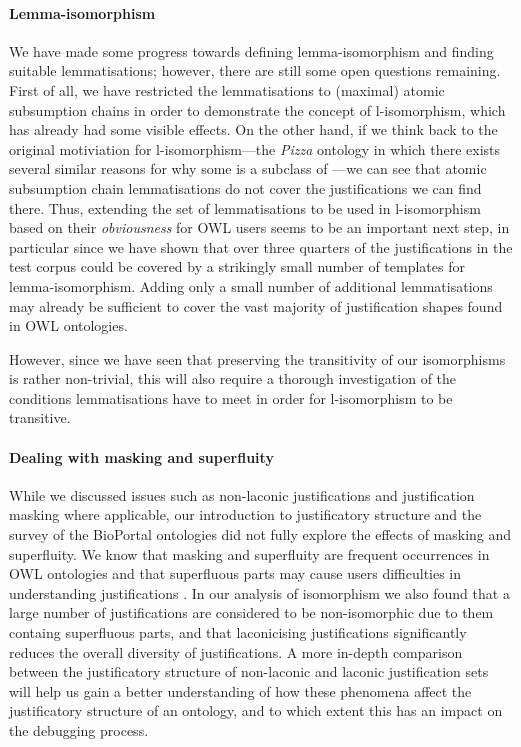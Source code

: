 \paragraph{Lemma-isomorphism}
We have made some progress towards defining lemma-isomorphism and finding suitable lemmatisations; however, there are still some open questions remaining. First of all, we have restricted the lemmatisations to (maximal) atomic subsumption chains in order to demonstrate the concept of l-isomorphism, which has already had some visible effects. On the other hand, if we think back to the original motiviation for l-isomorphism---the \emph{Pizza} ontology in which there exists several similar reasons for why some  is a subclass of ---we can see that atomic subsumption chain lemmatisations do not cover the justifications we can find there. Thus, extending the set of lemmatisations to be used in l-isomorphism based on their \emph{obviousness} for OWL users seems to be an important next step, in particular since we have shown  that over three quarters of the justifications in the test corpus could be covered by a strikingly small number of templates for lemma-isomorphism. Adding only a small number of additional lemmatisations may already be sufficient to cover the vast majority of justification shapes found in OWL ontologies.

However, since we have seen that preserving the transitivity of our isomorphisms is rather non-trivial, this will also require a thorough investigation of the conditions lemmatisations have to meet in order for l-isomorphism to be transitive.


\paragraph{Dealing with masking and superfluity}

While we discussed issues such as non-laconic justifications and justification masking where applicable, our introduction to justificatory structure and the survey of the BioPortal ontologies did not fully explore the effects of masking and superfluity. We know that masking and superfluity are frequent occurrences in OWL ontologies \cite{horridge11ab} and that superfluous parts may cause users difficulties in understanding justifications \cite{horridge11gj}. In our analysis of isomorphism we also found that a large number of justifications are considered to be non-isomorphic due to them containg superfluous parts, and that laconicising justifications significantly reduces the overall diversity of justifications. A more in-depth comparison between the justificatory structure of non-laconic and laconic justification sets will help us gain a better understanding of how these phenomena affect the justificatory structure of an ontology, and to which extent this has an impact on the debugging process.


